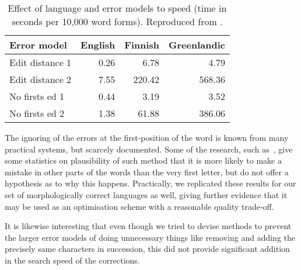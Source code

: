 \documentclass[officiallayout,final]{unihelcompling}
\begin{document}
\begin{table}
    \centering
\begin{tabular}{|l|rrr|} \hline \bf Error model & \bf English & \bf Finnish &
    \bf Greenlandic \\ \hline Edit distance 1 & 0.26&6.78&4.79 \\ Edit distance
    2 & 7.55&220.42&568.36 \\
No firsts ed 1 & 0.44&3.19&3.52 \\ No firsts ed 2 & 1.38&61.88&386.06 \\
\hline \end{tabular}

    \caption{Effect of language and error models to speed (time in seconds per 
        10,000 word forms). Reproduced from .
    \label{table:fsmnlp-2012-repro}}
\end{table}

The ignoring of the errors at the first-position of the word is known from many
practical systems, but scarcely documented. Some of the research, such
as~\citet{bhagat2007spelling}, give some statistics on plausibility of such
method that it is more likely to make a mistake in other parts of the words
than the very first letter, but do not offer a hypothesis as to why this
happens.  Practically, we replicated these results for our set of
morphologically correct languages as well, giving further evidence that it may
be used as an optimisation scheme with a reasonable quality trade-off.

It is likewise interesting that even though we tried to devise methods to
prevent the larger error models of doing unnecessary things like removing and
adding the precisely same characters in succession, this did not provide
significant addition in the search speed of the corrections.
\end{document}
